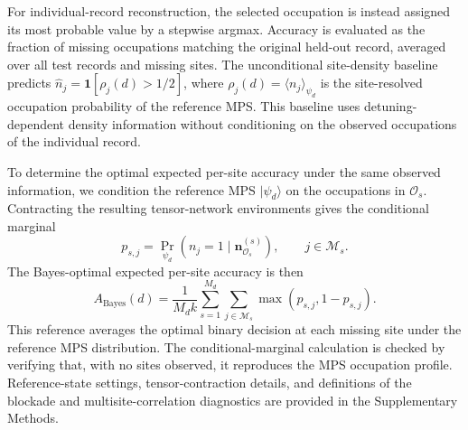 \documentclass[pdflatex,sn-nature]{sn-jnl}%
\theoremstyle{thmstyleone}%
\theoremstyle{thmstyletwo}%
\theoremstyle{thmstylethree}%
\begin{document}
For individual-record reconstruction, the selected occupation is instead assigned its most probable value by a stepwise argmax. Accuracy is evaluated as the fraction of missing occupations matching the original held-out record, averaged over all test records and missing sites. The unconditional site-density baseline predicts
\(\widehat n_j=\mathbf{1}[\rho_j(d)>1/2]\),
where \(\rho_j(d)=\langle n_j\rangle_{\psi_d}\) is the site-resolved occupation probability of the reference MPS. This baseline uses detuning-dependent density information without conditioning on the observed occupations of the individual record.

To determine the optimal expected per-site accuracy under the same observed information, we condition the reference MPS \(\lvert\psi_d\rangle\) on the occupations in \(\mathcal{O}_s\). Contracting the resulting tensor-network environments gives the conditional marginal
\begin{equation}
\label{eq:rydberg_conditional_marginal}
p_{s,j}
=
\Pr_{\psi_d}
\left(
n_j=1
\mid
\mathbf{n}_{\mathcal{O}_s}^{(s)}
\right),
\qquad j\in\mathcal{M}_s.
\end{equation}
The Bayes-optimal expected per-site accuracy is then
\begin{equation}
\label{eq:rydberg_bayes_accuracy}
A_{\mathrm{Bayes}}(d)
=
\frac{1}{M_d k}
\sum_{s=1}^{M_d}
\sum_{j\in\mathcal{M}_s}
\max\!\left(p_{s,j},1-p_{s,j}\right).
\end{equation}
This reference averages the optimal binary decision at each missing site under the reference MPS distribution. The conditional-marginal calculation is checked by verifying that, with no sites observed, it reproduces the MPS occupation profile. Reference-state settings, tensor-contraction details, and definitions of the blockade and multisite-correlation diagnostics are provided in the Supplementary Methods.



\end{document}
